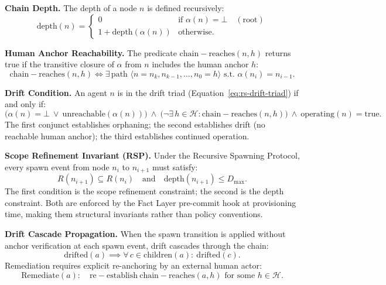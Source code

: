 \medskip
\noindent\textbf{Chain Depth.}
The depth of a node $n$ is defined recursively:
\begin{equation}
\mathrm{depth}(n) = 
\begin{cases}
0 & \text{if } \alpha(n) = \bot \quad (\text{root}) \\
1 + \mathrm{depth}(\alpha(n)) & \text{otherwise}.
\end{cases}
\label{eq:rs-depth}
\end{equation}

\medskip
\noindent\textbf{Human Anchor Reachability.}
The predicate $\mathrm{chain-reaches}(n, h)$ returns true if the transitive closure of $\alpha$ from $n$ includes the human anchor $h$:
\begin{equation}
\mathrm{chain-reaches}(n, h) \iff \exists\, \text{path } \langle n = n_k, n_{k-1}, \ldots, n_0 = h \rangle \text{ s.t. } \alpha(n_i) = n_{i-1}.
\label{eq:rs-chain-reaches}
\end{equation}

\medskip
\noindent\textbf{Drift Condition.}
An agent $n$ is in the drift triad (Equation~\ref{eq:rs-drift-triad}) if and only if:
\begin{equation}
\bigl( \alpha(n) = \bot \ \lor \ \mathrm{unreachable}(\alpha(n)) \bigr)\ \land\ \bigl( \neg\exists\, h \in \mathcal{H} : \mathrm{chain-reaches}(n, h) \bigr)\ \land\ \mathrm{operating}(n) = \mathrm{true}.
\label{eq:rs-drift-condition}
\end{equation}
The first conjunct establishes orphaning; the second establishes drift (no reachable human anchor); the third establishes continued operation.

\medskip
\noindent\textbf{Scope Refinement Invariant (RSP).}
Under the Recursive Spawning Protocol, every spawn event from node $n_i$ to $n_{i+1}$ must satisfy:
\begin{equation}
R(n_{i+1}) \subseteq R(n_i) \quad \text{and} \quad \mathrm{depth}(n_{i+1}) \leq D_{\max}.
\label{eq:rs-scope-refinement}
\end{equation}
The first condition is the scope refinement constraint; the second is the depth constraint. Both are enforced by the Fact Layer pre-commit hook at provisioning time, making them structural invariants rather than policy conventions.

\medskip
\noindent\textbf{Drift Cascade Propagation.}
When the spawn transition is applied without anchor verification at each spawn event, drift cascades through the chain:
\begin{equation}
\mathrm{drifted}(a) \implies \forall\, c \in \mathrm{children}(a):\ \mathrm{drifted}(c).
\label{eq:rs-drift-propagation}
\end{equation}
Remediation requires explicit re-anchoring by an external human actor:
\begin{equation}
\mathrm{Remediate}(a):\quad \mathrm{re-establish}\ \mathrm{chain-reaches}(a, h) \text{ for some } h \in \mathcal{H}.
\label{eq:rs-drift-remediation}
\end{equation}

